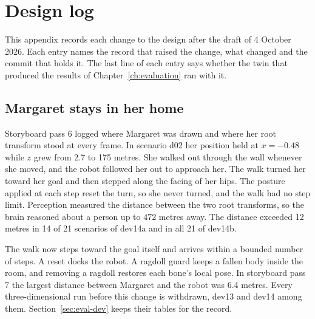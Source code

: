 \chapter{Design log}\label{app:design-log}


This appendix records each change to the design after the draft of 4 October 2026.
Each entry names the record that raised the change, what changed and the commit that holds it.
The last line of each entry says whether the twin that produced the results of
Chapter~\ref{ch:evaluation} ran with it.

\section{Margaret stays in her home}\label{sec:log-walk}

Storyboard pass 6 logged where Margaret was drawn and where her root transform stood at every
frame.
In scenario d02 her position held at $x=-0.48$ while $z$ grew from 2.7 to 175 metres.
She walked out through the wall whenever she moved, and the robot followed her out to approach
her.
The walk turned her toward her goal and then stepped along the facing of her hips.
The posture applied at each step reset the turn, so she never turned, and the walk had no step
limit.
Perception measured the distance between the two root transforms, so the brain reasoned about a
person up to 472 metres away.
The distance exceeded 12 metres in 14 of 21 scenarios of dev14a and in all 21 of dev14b.

The walk now steps toward the goal itself and arrives within a bounded number of steps.
A reset docks the robot.
A ragdoll guard keeps a fallen body inside the room, and removing a ragdoll restores each bone's
local pose.
In storyboard pass 7 the largest distance between Margaret and the robot was 6.4 metres.
Every three-dimensional run before this change is withdrawn, dev13 and dev14 among them.
Section~\ref{sec:eval-dev} keeps their tables for the record.

